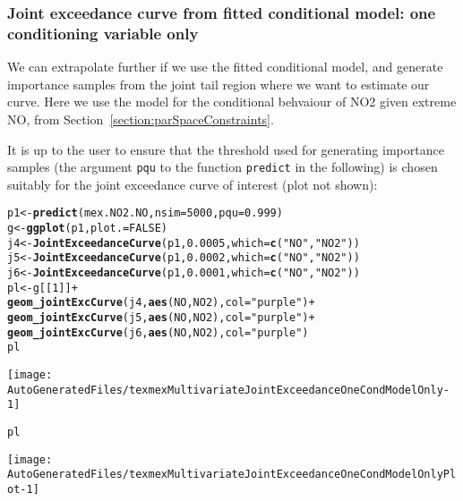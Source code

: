\documentclass[10pt]{article}\usepackage[]{graphicx}\usepackage[]{color}
\makeatletter
\def\maxwidth{ %
  \ifdim\Gin@nat@width>\linewidth
    \linewidth
  \else
    \Gin@nat@width
  \fi
}
\newcommand{\hlnum}[1]{\textcolor[rgb]{0.686,0.059,0.569}{#1}}%
\newcommand{\hlstr}[1]{\textcolor[rgb]{0.192,0.494,0.8}{#1}}%
\newcommand{\hlopt}[1]{\textcolor[rgb]{0,0,0}{#1}}%
\newcommand{\hlstd}[1]{\textcolor[rgb]{0.345,0.345,0.345}{#1}}%
\newcommand{\hlkwb}[1]{\textcolor[rgb]{0.69,0.353,0.396}{#1}}%
\newcommand{\hlkwc}[1]{\textcolor[rgb]{0.333,0.667,0.333}{#1}}%
\newcommand{\hlkwd}[1]{\textcolor[rgb]{0.737,0.353,0.396}{\textbf{#1}}}%
\newenvironment{kframe}{%
 \def\at@end@of@kframe{}%
 \ifinner\ifhmode%
  \def\at@end@of@kframe{\end{minipage}}%
  \begin{minipage}{\columnwidth}%
 \fi\fi%
 \def\FrameCommand##1{\hskip\@totalleftmargin \hskip-\fboxsep
 \colorbox{shadecolor}{##1}\hskip-\fboxsep
     \hskip-\linewidth \hskip-\@totalleftmargin \hskip\columnwidth}%
 \MakeFramed {\advance\hsize-\width
   \@totalleftmargin\z@ \linewidth\hsize
   \@setminipage}}%
 {\par\unskip\endMakeFramed%
 \at@end@of@kframe}
\newenvironment{knitrout}{}{} %
\makeatother
\begin{document}
\subsubsection{Joint exceedance curve from fitted conditional model: one conditioning variable only}

We can extrapolate further if we use the fitted conditional model, and generate importance samples from the joint tail region where we want to estimate our curve.  Here we use the model for the conditional behvaiour of NO2 given extreme NO, from Section~\ref{section:parSpaceConstraints}.

It is up to the user to ensure that the threshold used for generating importance samples (the argument {\tt pqu} to the function {\tt predict} in the following) is chosen suitably for the joint exceedance curve of interest (plot not shown):

\begin{knitrout}
\color{fgcolor}\begin{kframe}
\begin{alltt}
\hlstd{p1} \hlkwb{<-} \hlkwd{predict}\hlstd{(mex.NO2.NO,}\hlkwc{nsim}\hlstd{=}\hlnum{5000}\hlstd{,}\hlkwc{pqu}\hlstd{=}\hlnum{0.999}\hlstd{)}
\hlstd{g} \hlkwb{<-} \hlkwd{ggplot}\hlstd{(p1,}\hlkwc{plot.}\hlstd{=}\hlnum{FALSE}\hlstd{)}
\hlstd{j4} \hlkwb{<-} \hlkwd{JointExceedanceCurve}\hlstd{(p1,}\hlnum{0.0005}\hlstd{,}\hlkwc{which}\hlstd{=}\hlkwd{c}\hlstd{(}\hlstr{"NO"}\hlstd{,}\hlstr{"NO2"}\hlstd{))}
\hlstd{j5} \hlkwb{<-} \hlkwd{JointExceedanceCurve}\hlstd{(p1,}\hlnum{0.0002}\hlstd{,}\hlkwc{which}\hlstd{=}\hlkwd{c}\hlstd{(}\hlstr{"NO"}\hlstd{,}\hlstr{"NO2"}\hlstd{))}
\hlstd{j6} \hlkwb{<-} \hlkwd{JointExceedanceCurve}\hlstd{(p1,}\hlnum{0.0001}\hlstd{,}\hlkwc{which}\hlstd{=}\hlkwd{c}\hlstd{(}\hlstr{"NO"}\hlstd{,}\hlstr{"NO2"}\hlstd{))}
\hlstd{pl} \hlkwb{<-} \hlstd{g[[}\hlnum{1}\hlstd{]]} \hlopt{+}
    \hlkwd{geom_jointExcCurve}\hlstd{(j4,}\hlkwd{aes}\hlstd{(NO,NO2),}\hlkwc{col}\hlstd{=}\hlstr{"purple"}\hlstd{)} \hlopt{+}
    \hlkwd{geom_jointExcCurve}\hlstd{(j5,}\hlkwd{aes}\hlstd{(NO,NO2),}\hlkwc{col}\hlstd{=}\hlstr{"purple"}\hlstd{)} \hlopt{+}
    \hlkwd{geom_jointExcCurve}\hlstd{(j6,}\hlkwd{aes}\hlstd{(NO,NO2),}\hlkwc{col}\hlstd{=}\hlstr{"purple"}\hlstd{)}
\hlstd{pl}
\end{alltt}
\end{kframe}
\texttt{[image: AutoGeneratedFiles/texmexMultivariateJointExceedanceOneCondModelOnly-1]} 

\end{knitrout}
\begin{knitrout}
\color{fgcolor}\begin{kframe}
\begin{alltt}
\hlstd{pl}
\end{alltt}
\end{kframe}
\texttt{[image: AutoGeneratedFiles/texmexMultivariateJointExceedanceOneCondModelOnlyPlot-1]} 

\end{knitrout}
\end{document}
